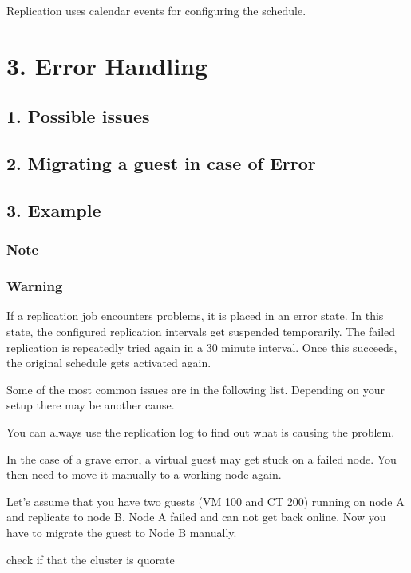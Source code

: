 Replication uses calendar events for configuring the schedule.


\section{3. Error Handling}

\subsection{1. Possible issues}

\subsection{2. Migrating a guest in case of Error}

\subsection{3. Example}

\subsubsection{Note}

\subsubsection{Warning}

If a replication job encounters problems, it is placed in an error state. In this state, the configured replication intervals get suspended temporarily. The failed replication is repeatedly tried again in a 30 minute interval. Once this succeeds, the original schedule gets activated again.

Some of the most common issues are in the following list. Depending on your setup there may be another cause.

You can always use the replication log to find out what is causing the problem.

In the case of a grave error, a virtual guest may get stuck on a failed node. You then need to move it manually to a working node again.

Let’s assume that you have two guests (VM 100 and CT 200) running on node A and replicate to node B. Node A failed and can not get back online. Now you have to migrate the guest to Node B manually.

check if that the cluster is quorate


